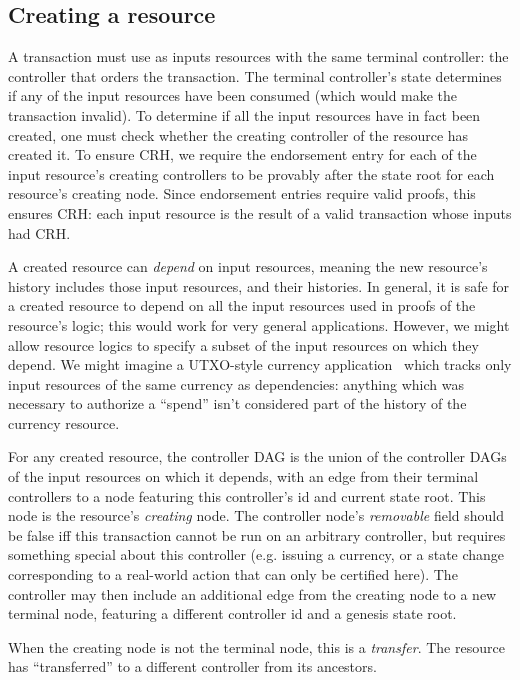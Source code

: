\documentclass[a4paper,USenglish,cleveref, autoref, thm-restate, anonymous]{lipics-v2021}
\begin{document}
\subsection{Creating a resource}
A transaction must use as inputs resources with the same terminal controller: the controller that orders the transaction. 
The terminal controller's state determines if any of the input resources have been consumed (which would make the transaction invalid).
To determine if all the input resources have in fact been created, one must check whether the creating controller of the resource has created it. 
To ensure CRH, we require the endorsement entry for each of the input resource's creating controllers to be provably after the state root for each resource's creating node. 
Since endorsement entries require valid proofs, this ensures CRH: each input resource is the result of a valid transaction whose inputs had CRH. 

A created resource can \textit{depend} on input resources, meaning the new resource's history includes those input resources, and their histories. 
In general, it is safe for a created resource to depend on all the input resources used in proofs of the resource's logic; this would work for very general applications.
However, we might allow resource logics to specify a subset of the input resources on which they depend. 
We might imagine a UTXO-style currency application~\cite{citation-needed} which tracks only input resources of the same currency as dependencies: anything which was necessary to authorize a ``spend'' isn't considered part of the history of the currency resource.

For any created resource, the controller DAG is the union of the controller DAGs of the input resources on which it depends, with an edge from their terminal controllers to a node featuring this controller's id and current state root. 
This node is the resource's \textit{creating} node. 
The controller node's \textit{removable} field should be false iff this transaction cannot be run on an arbitrary controller, but requires something special about this controller (e.g. issuing a currency, or a state change corresponding to a real-world action that can only be certified here). 
The controller may then include an additional edge from the creating node to a new terminal node, featuring a different controller id and a genesis state root. 

When the creating node is not the terminal node, this is a \textit{transfer}.
The resource has ``transferred'' to a different controller from its ancestors. 
\end{document}
